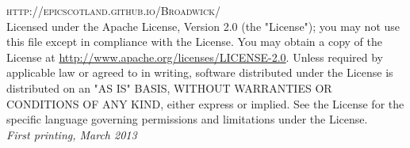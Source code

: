 \documentclass[11pt,fleqn]{book} %
\begin{document}

\noindent \textsc{http://epicscotland.github.io/Broadwick/}\\ %

\noindent Licensed under the Apache License, Version 2.0 (the "License"); you may not use this file except in compliance with the License.  You may obtain a copy of the License at \url{http://www.apache.org/licenses/LICENSE-2.0}. Unless required by applicable law or agreed to in writing, software distributed under the License is distributed on an "AS IS" BASIS, WITHOUT WARRANTIES OR CONDITIONS OF ANY KIND, either express or implied.  See the License for the specific language governing permissions and limitations under the License.\\ %

\noindent \textit{First printing, March 2013} %



\pagestyle{empty} %

\tableofcontents %

\cleardoublepage %

\pagestyle{fancy} %











\end{document}
